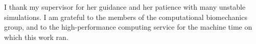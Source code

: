I thank my supervisor for her guidance and her patience with many unstable simulations. I am
grateful to the members of the computational biomechanics group, and to the high-performance
computing service for the machine time on which this work ran.
